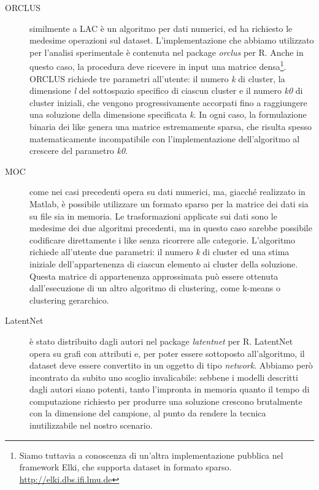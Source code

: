 \begin{description}
\item[ORCLUS] similmente a LAC \`e un algoritmo per dati numerici, ed ha richiesto le medesime operazioni sul dataset. L'implementazione che abbiamo utilizzato per l'analisi sperimentale \`e contenuta nel package \textit{orclus} per R. Anche in questo caso, la procedura deve ricevere in input una matrice densa\footnote{Siamo tuttavia a conoscenza di un'altra implementazione pubblica nel framework Elki, che supporta dataset in formato sparso.\\ \url{http://elki.dbs.ifi.lmu.de}}. ORCLUS richiede tre parametri all'utente: il numero \textit{k} di cluster, la dimensione \textit{l} del sottospazio specifico di ciascun cluster e il numero \textit{k0} di cluster iniziali, che vengono progressivamente accorpati fino a raggiungere una soluzione della dimensione specificata \textit{k}. In ogni caso, la formulazione binaria dei like genera una matrice estremamente sparsa, che risulta spesso matematicamente incompatibile con l'implementazione dell'algoritmo al crescere del parametro \textit{k0}.
\item[MOC] come nei casi precedenti opera su dati numerici, ma, giacch\'e realizzato in Matlab, \`e possibile utilizzare un formato sparso per la matrice dei dati sia su file sia in memoria. Le trasformazioni applicate sui dati sono le medesime dei due algoritmi precedenti, ma in questo caso sarebbe possibile codificare direttamente i like senza ricorrere alle categorie. L'algoritmo richiede all'utente due parametri: il numero \textit{k} di cluster ed una stima iniziale dell'appartenenza di ciascun elemento ai cluster della soluzione. Questa matrice di appartenenza approssimata pu\`o essere ottenuta dall'esecuzione di un altro algoritmo di clustering, come k-means o clustering gerarchico.
\item[LatentNet] \`e stato distribuito dagli autori nel package \textit{latentnet} per R. LatentNet opera su grafi con attributi e, per poter essere sottoposto all'algoritmo, il dataset deve essere convertito in un oggetto di tipo \textit{network}. Abbiamo per\`o incontrato da subito uno scoglio invalicabile: sebbene i modelli descritti dagli autori siano potenti, tanto l'impronta in memoria quanto il tempo di computazione richiesto per produrre una soluzione crescono brutalmente con la dimensione del campione, al punto da rendere la tecnica inutilizzabile nel nostro scenario.

\end{description}
